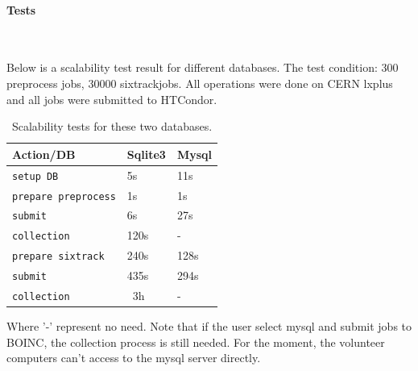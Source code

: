 \paragraph{Tests}~

Below is a scalability test result for different databases. The test condition: 300 preprocess jobs, 30000 sixtrackjobs. All operations were done on CERN lxplus and all jobs were submitted to HTCondor.
\begin{table}[h]
    \caption{Scalability tests for these two databases.}
    \label{T-ExtRou}
    \centering
    \renewcommand{\arraystretch}{1.5}
    \begin{tabular}{|l|l|l|}
        \hline
        \rowcolor{blue!30}
        \textbf{Action/DB} & \textbf{Sqlite3} & \textbf{Mysql} \\
        \hline
        \texttt{setup DB}  & 5s & 11s \\
        \hline
        \texttt{prepare preprocess}  & 1s & 1s \\
        \hline
        \texttt{submit}   & 6s    & 27s \\
        \hline
        \texttt{collection}   & 120s   & - \\
        \hline
        \texttt{prepare sixtrack}  & 240s & 128s \\
        \hline
        \texttt{submit}   & 435s    & 294s \\
        \hline
        \texttt{collection}   & ~3h   & - \\
        \hline
    \end{tabular}
\end{table}

Where '-' represent no need.
Note that if the user select mysql and submit jobs to BOINC, the collection process is still needed. For the moment, the volunteer computers can't access to the mysql server directly.

%
%
